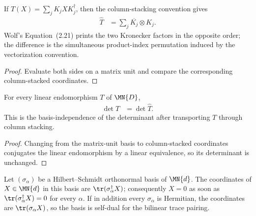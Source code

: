 \begin{theorem}
    \label{thm:transfer_matrix_kraus}
    \leanok
    If
    $T(X)=\sum_j K_jXK_j^\dagger$, then the column-stacking
    convention gives
    \begin{align}
        \widehat T
        &=\sum_j \overline{K_j}\otimes K_j.
    \end{align}
    Wolf's Equation~(2.21) prints the two Kronecker factors in the opposite
    order; the difference is the simultaneous product-index permutation
    induced by the vectorization convention.
\end{theorem}

\begin{proof}\leanok
    Evaluate both sides on a matrix unit and compare the corresponding
    column-stacked coordinates.
\end{proof}

\begin{theorem}
    \label{thm:channel_det_transfer_matrix}
    \leanok
    For every linear endomorphism $T$ of $\MN{D}$,
    \begin{align}
        \det T
        &=\det\widehat T.
    \end{align}
    This is the basis-independence of the determinant after transporting $T$
    through column stacking.
\end{theorem}

\begin{proof}\leanok
    Changing from the matrix-unit basis to column-stacked coordinates
    conjugates the linear endomorphism by a linear equivalence, so its
    determinant is unchanged.
\end{proof}

\begin{lemma}
    \label{lem:hilbert_schmidt_orthonormal_coordinates}
    \leanok
    Let $(\sigma_\alpha)$ be a Hilbert--Schmidt orthonormal basis of $\MN{d}$.
    The coordinates of $X\in\MN{d}$ in this basis are
    $\tr(\sigma_\alpha^\dagger X)$; consequently $X=0$ as soon as
    $\tr(\sigma_\alpha^\dagger X)=0$ for every $\alpha$. If in addition every
    $\sigma_\alpha$ is Hermitian, the coordinates are $\tr(\sigma_\alpha X)$, so
    the basis is self-dual for the bilinear trace pairing.
\end{lemma}

